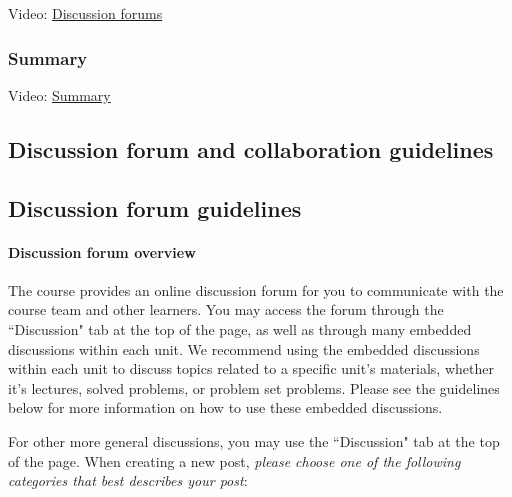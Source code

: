 \documentclass[pdftex, brazil, 12pt, twoside]{article}
\begin{document}
Video: \href{https://www.youtube.com/watch?v=Q-rY8DIwYgg}{Discussion forums}

\subsubsection{Summary}
\label{ovw0-edx-}

Video: \href{https://www.youtube.com/watch?v=RQdyRhHDlRo}{Summary}


\subsection{Discussion forum and collaboration guidelines}
\label{ovw0-forum}

\subsection{Discussion forum guidelines}
\label{ovw0-forum-guide}

\paragraph{Discussion forum overview} The course provides an online discussion
forum for you to communicate with the course
team and other learners. You may access the forum through the “Discussion" tab at the
top of the page, as well as through many embedded discussions within each unit.
We recommend using the embedded discussions within each unit to discuss topics related
to a specific unit's materials, whether it's lectures, solved problems, or problem
set problems. Please see the guidelines below for more information on how to use
these embedded discussions.

For other more general discussions, you may use the “Discussion" tab at the top of
the page. When creating a new post, \emph{please choose one of the following categories that
best describes your post}:
\end{document}
